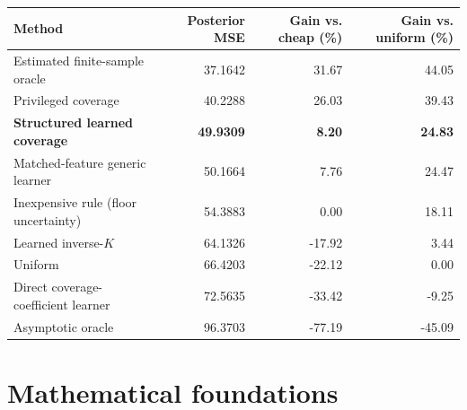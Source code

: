 \documentclass[10pt,letterpaper]{article}
\begin{document}
\begin{center}\begin{minipage}{\linewidth}\centering\small
\begin{tabular}{@{}lrrr@{}}\toprule
Method & Posterior MSE & Gain vs. cheap (\%) & Gain vs. uniform (\%)\\\midrule
Estimated finite-sample oracle & 37.1642 & 31.67 & 44.05\\
Privileged coverage & 40.2288 & 26.03 & 39.43\\
\textbf{Structured learned coverage} & \textbf{49.9309} & \textbf{8.20} & \textbf{24.83}\\
Matched-feature generic learner & 50.1664 & 7.76 & 24.47\\
Inexpensive rule (floor uncertainty) & 54.3883 & 0.00 & 18.11\\
Learned inverse-$K$ & 64.1326 & -17.92 & 3.44\\
Uniform & 66.4203 & -22.12 & 0.00\\
Direct coverage-coefficient learner & 72.5635 & -33.42 & -9.25\\
Asymptotic oracle & 96.3703 & -77.19 & -45.09\\\bottomrule
\end{tabular}
\label{tab:mainwifi}
\end{minipage}\end{center}
\section{Mathematical foundations}
\end{document}
